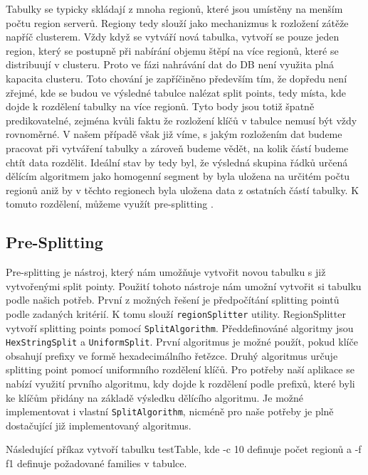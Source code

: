 \documentclass[thesis=M,czech]{FITthesis}[2012/06/26]
\begin{document}
Tabulky se typicky skládají z mnoha regionů, které jsou umístěny na menším počtu region serverů. Regiony tedy slouží jako mechanizmus k rozložení zátěže napříč clusterem. Vždy když se vytváří nová tabulka, vytvoří se pouze jeden region, který se postupně při nabírání objemu štěpí na více regionů, které se distribuují v clusteru. Proto ve fázi nahrávání dat do DB není využita plná kapacita clusteru. Toto chování je zapříčiněno především tím, že dopředu není zřejmé, kde se budou ve výsledné tabulce nalézat split points, tedy místa, kde dojde k rozdělení tabulky na více regionů. Tyto body jsou totiž špatně predikovatelné, zejména kvůli faktu že rozložení klíčů v tabulce nemusí být vždy rovnoměrné. V našem případě však již víme, s jakým rozložením dat budeme pracovat při vytváření tabulky a zároveň budeme vědět, na kolik částí budeme chtít data rozdělit. Ideální stav by tedy byl, že výsledná skupina řádků určená dělícím algoritmem jako homogenní segment by byla uložena na určitém počtu regionů aniž by v těchto regionech byla uložena data z ostatních částí tabulky. K tomuto rozdělení, můžeme využít pre-splitting \cite{split}.

\subsection{Pre-Splitting}
Pre-splitting je nástroj, který nám umožňuje vytvořit novou tabulku s již vytvořenými split pointy. Použití tohoto nástroje nám umožní vytvořit si tabulku podle našich potřeb. První z možných řešení je předpočítání splitting pointů podle zadaných kritérií. K tomu slouží \texttt{regionSplitter} utility. RegionSplitter vytvoří splitting points pomocí \texttt{SplitAlgorithm}. Předdefinováné algoritmy jsou \texttt{HexStringSplit} a \texttt{UniformSplit}. První algoritmus je možné použít, pokud klíče obsahují prefixy ve formě hexadecimálního řetězce. Druhý algoritmus určuje splitting point pomocí uniformního rozdělení klíčů. Pro potřeby naší aplikace se nabízí využití prvního algoritmu, kdy dojde k rozdělení podle prefixů, které byli ke klíčům přidány na základě výsledku dělícího algoritmu. Je možné implementovat i vlastní \texttt{SplitAlgorithm}, nicméně pro naše potřeby je plně dostačující již implementovaný algoritmus.

Následující příkaz vytvoří tabulku testTable, kde -c 10 definuje počet regionů a -f f1 definuje požadované families v tabulce.
\end{document}

